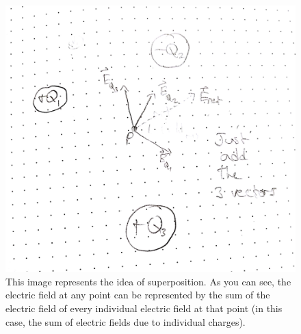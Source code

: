 \documentclass{article}
\begin{document}
\begin{figure}[ht]
\center
\includegraphics[width=.4\textwidth]{Vectors2.jpg}
\caption{This image represents the idea of superposition. As you can see, the electric field at any point can be represented by the sum of the electric field of every individual electric field at that point (in this case, the sum of electric fields due to individual charges).}
\end{figure}\\
\\
\end{document}
